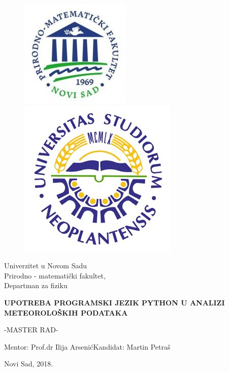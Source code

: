 \documentclass[12pt]{article}
\begin{document}
\clearpage

\begin{figure}[h]
\includegraphics[width=0.3\linewidth]{PMF.jpg}
\includegraphics[width=0.3\linewidth,right=10cm]{uns.jpg}
\end{figure}

\begin{center}
{\Large Univerzitet u Novom Sadu\\\Large Prirodno - matematički fakultet,\\ \Large Departman za fiziku}
\end {center}
\begin{center}
\vspace{3.cm}
{\Large  \textbf{UPOTREBA PROGRAMSKI JEZIK PYTHON U ANALIZI METEOROLOŠKIH PODATAKA}}
\end {center}
\vspace{1.cm}
\begin{center}
\Large -MASTER RAD-
\end{center}
\vspace{3cm}
\begin{center}Mentor: Prof.dr Ilija Arsenić\hfill Kandidat: Martin Petraš
\end{center}
\vspace{0.5cm}
\begin{center}
Novi Sad, 2018.
\end{center}
\newpage
\pagebreak
\begin{center}
\tableofcontents
\end{center}
\newpage
\pagebreak
{}

\newpage
\end{document}

